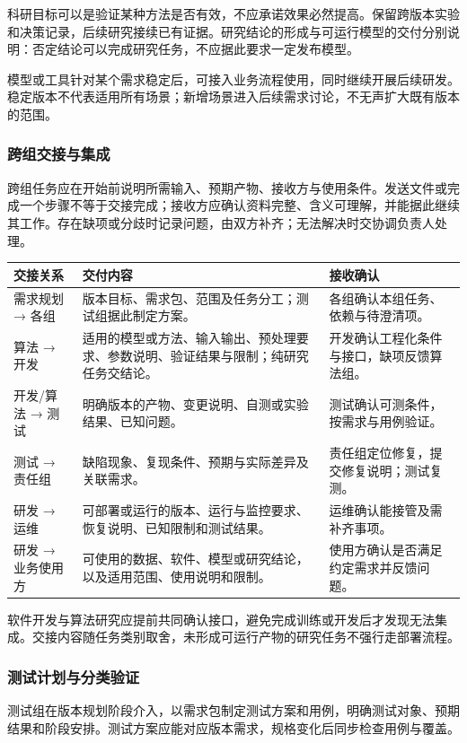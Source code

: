\documentclass[11pt,a4paper]{article}
\begin{document}
科研目标可以是验证某种方法是否有效，不应承诺效果必然提高。保留跨版本实验和决策记录，后续研究接续已有证据。研究结论的形成与可运行模型的交付分别说明：否定结论可以完成研究任务，不应据此要求一定发布模型。

模型或工具针对某个需求稳定后，可接入业务流程使用，同时继续开展后续研发。稳定版本不代表适用所有场景；新增场景进入后续需求讨论，不无声扩大既有版本的范围。

\subsubsection{跨组交接与集成}\label{sec:handoff}
跨组任务应在开始前说明所需输入、预期产物、接收方与使用条件。发送文件或完成一个步骤不等于交接完成；接收方应确认资料完整、含义可理解，并能据此继续其工作。存在缺项或分歧时记录问题，由双方补齐；无法解决时交协调负责人处理。

\begin{longtable}{L{29mm}L{75mm}L{48mm}}
\toprule
交接关系 & 交付内容 & 接收确认\\\midrule\endhead
需求规划 → 各组 & 版本目标、需求包、范围及任务分工；测试组据此制定方案。 & 各组确认本组任务、依赖与待澄清项。\\
算法 → 开发 & 适用的模型或方法、输入输出、预处理要求、参数说明、验证结果与限制；纯研究任务交结论。 & 开发确认工程化条件与接口，缺项反馈算法组。\\
开发/算法 → 测试 & 明确版本的产物、变更说明、自测或实验结果、已知问题。 & 测试确认可测条件，按需求与用例验证。\\
测试 → 责任组 & 缺陷现象、复现条件、预期与实际差异及关联需求。 & 责任组定位修复，提交修复说明；测试复测。\\
研发 → 运维 & 可部署或运行的版本、运行与监控要求、恢复说明、已知限制和测试结果。 & 运维确认能接管及需补齐事项。\\
研发 → 业务使用方 & 可使用的数据、软件、模型或研究结论，以及适用范围、使用说明和限制。 & 使用方确认是否满足约定需求并反馈问题。\\\bottomrule
\end{longtable}

软件开发与算法研究应提前共同确认接口，避免完成训练或开发后才发现无法集成。交接内容随任务类别取舍，未形成可运行产物的研究任务不强行走部署流程。

\subsubsection{测试计划与分类验证}
测试组在版本规划阶段介入，以需求包制定测试方案和用例，明确测试对象、预期结果和阶段安排。测试方案应能对应版本需求，规格变化后同步检查用例与覆盖。
\end{document}
